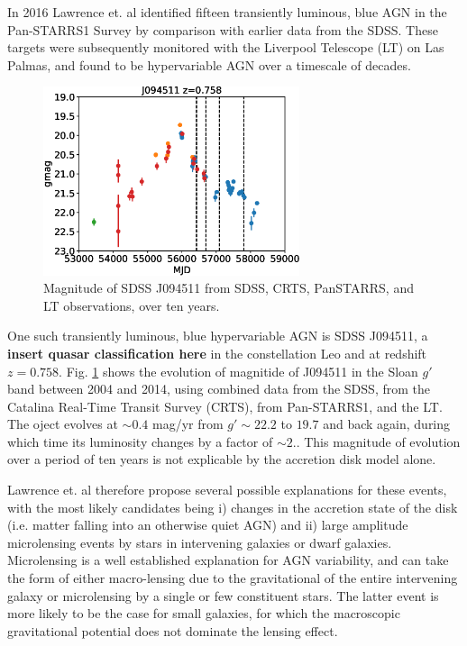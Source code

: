 \documentclass[a4paper,11pt]{article}
\begin{document}
In 2016 Lawrence et. al identified fifteen transiently luminous, blue AGN in the Pan-STARRS1 Survey by comparison with earlier data from the SDSS. These targets were subsequently monitored with the Liverpool Telescope (LT) on Las Palmas, and found to be hypervariable AGN over a timescale of decades.\cite{lawrence_2016}

\begin{figure}[h!]
    \centering
    \includegraphics[width=0.67\textwidth]{J094511_magnitudes.eps}
    \caption{Magnitude of SDSS J094511 from SDSS, CRTS, PanSTARRS, and LT observations, over ten years.}
    \label{fig:magplot}
\end{figure}

One such transiently luminous, blue hypervariable AGN is SDSS J094511, a \textbf{insert quasar classification here} in the constellation Leo and at redshift $z=0.758$.\cite{lawrence_2016}\cite{bruce_2017} Fig. \ref{fig:magplot} shows the evolution of magnitide of J094511 in the Sloan $g'$ band between 2004 and 2014, using combined data from the SDSS, from the Catalina Real-Time Transit Survey (CRTS), from Pan-STARRS1, and the LT. The oject evolves at $\sim 0.4 $ mag/yr from $g' \sim 22.2$ to $19.7$ and back again, during which time its luminosity changes by a factor of $\sim 2$.\cite{bruce_2017}. This magnitude of evolution over a period of ten years is not explicable by the accretion disk model alone.

Lawrence et. al therefore propose several possible explanations for these events, with the most likely candidates being i) changes in the accretion state of the disk (i.e. matter falling into an otherwise quiet AGN) and ii) large amplitude microlensing events by stars in intervening galaxies or dwarf galaxies.\cite{lawrence_2016} Microlensing is a well established explanation for AGN variability, and can take the form of either macro-lensing due to the gravitational of the entire intervening galaxy or microlensing by a single or few constituent stars. The latter event is more likely to be the case for small galaxies, for which the macroscopic gravitational potential does not dominate the lensing effect.\cite{lawrence_2016}
\end{document}
